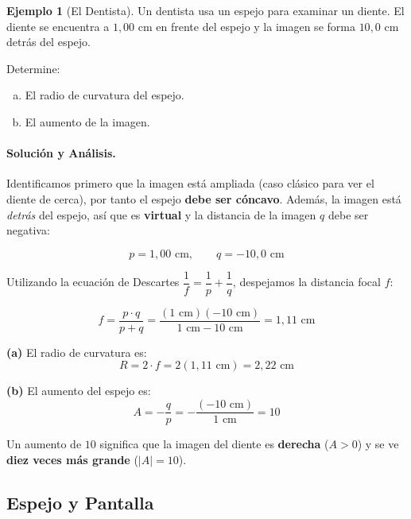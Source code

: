 \documentclass[12pt, a4paper]{article}
\theoremstyle{definition}
\newtheorem{ejemplo}{Ejemplo}[section]
\begin{document}
\begin{ejemplo}[El Dentista]
Un dentista usa un espejo para examinar un diente. El diente se encuentra a \(1{,}00\) cm en frente del espejo y la imagen se forma \(10{,}0\) cm detrás del espejo.

Determine:
\begin{enumerate}[(a)]
  \item El radio de curvatura del espejo.
  \item El aumento de la imagen.
\end{enumerate}
\end{ejemplo}

\paragraph{Solución y Análisis.}
Identificamos primero que la imagen está ampliada (caso clásico para ver el diente de cerca), por tanto el espejo \textbf{debe ser cóncavo}. Además, la imagen está \textit{detrás} del espejo, así que es \textbf{virtual} y la distancia de la imagen \(q\) debe ser negativa:

\[
  p = 1{,}00 \text{ cm}, \qquad q = -10{,}0 \text{ cm}
\]

Utilizando la ecuación de Descartes \(\dfrac{1}{f} = \dfrac{1}{p} + \dfrac{1}{q}\), despejamos la distancia focal \(f\):

\begin{equation}
  f = \frac{p \cdot q}{p + q} = \frac{(1 \text{ cm})(-10 \text{ cm})}{1 \text{ cm} - 10 \text{ cm}} = 1{,}11 \text{ cm}
  \label{eq:dental_f}
\end{equation}

\textbf{(a)} El radio de curvatura es:
\begin{equation}
  R = 2 \cdot f = 2(1{,}11 \text{ cm}) = 2{,}22 \text{ cm}
  \label{eq:dental_R}
\end{equation}

\textbf{(b)} El aumento del espejo es:
\begin{equation}
  A = -\frac{q}{p} = -\frac{(-10 \text{ cm})}{1 \text{ cm}} = 10
  \label{eq:dental_A}
\end{equation}

Un aumento de \(10\) significa que la imagen del diente es \textbf{derecha} (\(A > 0\)) y se ve \textbf{diez veces más grande} (\(|A| = 10\)).

\subsection{Espejo y Pantalla}
\end{document}
